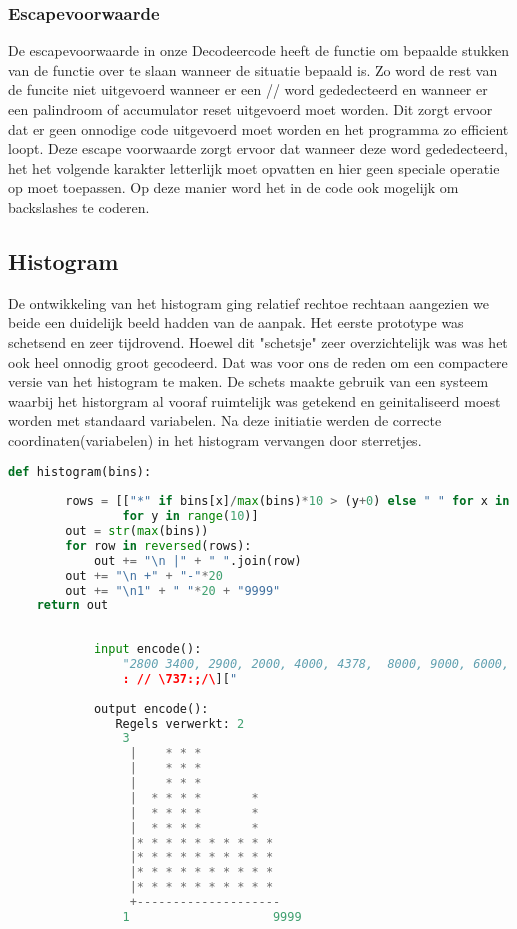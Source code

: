 \documentclass{article}
\begin{document}
    \subsubsection{Escapevoorwaarde}
    De escapevoorwaarde in onze Decodeercode heeft de functie om bepaalde stukken van de functie over te slaan wanneer de situatie bepaald is. Zo word de rest van de funcite niet uitgevoerd wanneer er een // word gededecteerd en wanneer er een palindroom of accumulator reset uitgevoerd moet worden. Dit zorgt ervoor dat er geen onnodige code uitgevoerd moet worden en het programma zo efficient loopt. Deze escape voorwaarde zorgt ervoor dat wanneer deze word gededecteerd, het het volgende karakter letterlijk moet opvatten en hier geen speciale operatie op moet toepassen. Op deze manier word het in de code ook mogelijk om backslashes te coderen.
    
    \subsection{Histogram}
      De ontwikkeling van het histogram ging relatief rechtoe rechtaan aangezien we beide een duidelijk beeld hadden van de aanpak. Het eerste prototype was schetsend en zeer tijdrovend. Hoewel dit "schetsje" zeer overzichtelijk was was het ook heel onnodig groot gecodeerd. Dat was voor ons de reden om een compactere versie van het histogram te maken. De schets maakte gebruik van een systeem waarbij het historgram al vooraf ruimtelijk was getekend en geinitaliseerd moest worden met standaard variabelen. Na deze initiatie werden de correcte coordinaten(variabelen) in het histogram vervangen door sterretjes. 
      \begin{lstlisting}[frame=single, language=python] 
    def histogram(bins):
    
        rows = [["*" if bins[x]/max(bins)*10 > (y+0) else " " for x in range(10)]
                for y in range(10)]
        out = str(max(bins))
        for row in reversed(rows):
            out += "\n |" + " ".join(row)
        out += "\n +" + "-"*20
        out += "\n1" + " "*20 + "9999"
    return out
      \end{lstlisting}
      
      \newpage
      \begin{lstlisting}[frame=single, language=python]  % Start your code-block
            
            input encode():
                "2800 3400, 2900, 2000, 4000, 4378,  8000, 9000, 6000, 5689, 3478, 4085, 7095, 1010,1785, 3000,8090
                : // \737:;/\]["
    
            output encode():
               Regels verwerkt: 2
                3
                 |    * * *          
                 |    * * *          
                 |    * * *          
                 |  * * * *       *  
                 |  * * * *       *  
                 |  * * * *       *  
                 |* * * * * * * * * *
                 |* * * * * * * * * *
                 |* * * * * * * * * *
                 |* * * * * * * * * *
                 +--------------------
                1                    9999
        \end{lstlisting}
      
\end{document}
